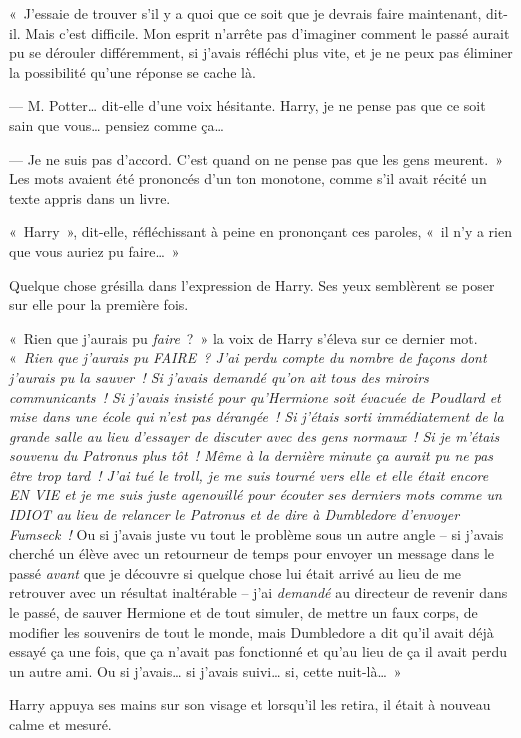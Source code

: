 «~J'essaie de trouver s'il y a quoi que ce soit que je devrais faire maintenant, dit-il.
Mais c'est difficile.
Mon esprit n'arrête pas d'imaginer comment le passé aurait pu se dérouler différemment, si j'avais réfléchi plus vite, et je ne peux pas éliminer la possibilité qu'une réponse se cache là.

--- M. Potter… dit-elle d'une voix hésitante.
Harry, je ne pense pas que ce soit sain que vous… pensiez comme ça…

--- Je ne suis pas d'accord.
C'est quand on ne pense pas que les gens meurent.~»
Les mots avaient été prononcés d'un ton monotone, comme s'il avait récité un texte appris dans un livre.

«~Harry~», dit-elle, réfléchissant à peine en prononçant ces paroles, «~il n'y a rien que vous auriez pu faire…~»

Quelque chose grésilla dans l'expression de Harry.
Ses yeux semblèrent se poser sur elle pour la première fois.

«~Rien que j'aurais pu \emph{faire}~?~»
la voix de Harry s'éleva sur ce dernier mot.
«~\emph{Rien que j'aurais pu FAIRE~?
J'ai perdu compte du nombre de façons dont j'aurais pu la sauver~!
Si j'avais demandé qu'on ait tous des miroirs communicants~!
Si j'avais insisté pour qu'Hermione soit évacuée de Poudlard et mise dans une école qui n'est pas dérangée~!
Si j'étais sorti immédiatement de la grande salle au lieu d'essayer de discuter avec des gens normaux~!
Si je m'étais souvenu du Patronus plus tôt~!
Même à la dernière minute ça aurait pu ne pas être trop tard~!
J'ai tué le troll, je me suis tourné vers elle et elle était encore EN VIE et je me suis juste agenouillé pour écouter ses derniers mots comme un IDIOT au lieu de relancer le Patronus et de dire à Dumbledore d'envoyer Fumseck~!} Ou si j'avais juste vu tout le problème sous un autre angle -- si j'avais cherché un élève avec un retourneur de temps pour envoyer un message dans le passé \emph{avant} que je découvre si quelque chose lui était arrivé au lieu de me retrouver avec un résultat inaltérable -- j'ai \emph{demandé} au directeur de revenir dans le passé, de sauver Hermione et de tout simuler, de mettre un faux corps, de modifier les souvenirs de tout le monde, mais Dumbledore a dit qu'il avait déjà essayé ça une fois, que ça n'avait pas fonctionné et qu'au lieu de ça il avait perdu un autre ami.
Ou si j'avais… si j'avais suivi… si, cette nuit-là…~»

Harry appuya ses mains sur son visage et lorsqu'il les retira, il était à nouveau calme et mesuré.

